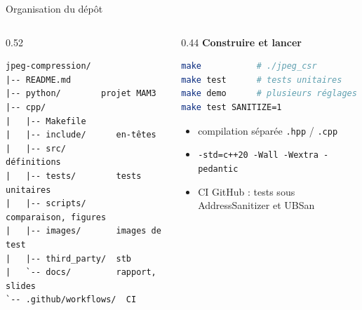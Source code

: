 \documentclass[aspectratio=169,10pt]{beamer}
\newcommand{\code}[1]{\texttt{#1}}
\begin{document}
\begin{frame}[fragile]{Organisation du dépôt}
  \begin{columns}[T]
    \begin{column}{0.52\textwidth}
\begin{lstlisting}[language={}, basicstyle=\ttfamily\footnotesize]
jpeg-compression/
|-- README.md
|-- python/        projet MAM3
|-- cpp/
|   |-- Makefile
|   |-- include/      en-têtes
|   |-- src/          définitions
|   |-- tests/        tests unitaires
|   |-- scripts/      comparaison, figures
|   |-- images/       images de test
|   |-- third_party/  stb
|   `-- docs/         rapport, slides
`-- .github/workflows/  CI
\end{lstlisting}
    \end{column}
    \begin{column}{0.44\textwidth}
      \textbf{Construire et lancer}
\begin{lstlisting}[language=bash, basicstyle=\ttfamily\footnotesize]
make           # ./jpeg_csr
make test      # tests unitaires
make demo      # plusieurs réglages
make test SANITIZE=1
\end{lstlisting}
      \vspace{0.4em}
      \begin{itemize}
        \item compilation séparée \code{.hpp} / \code{.cpp}
        \item \code{-std=c++20 -Wall -Wextra -pedantic}
        \item CI GitHub : tests sous AddressSanitizer et UBSan
      \end{itemize}
    \end{column}
  \end{columns}
\end{frame}
\end{document}
